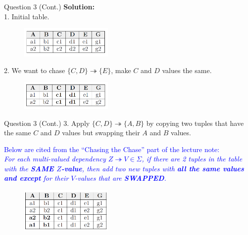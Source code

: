 \begin{frame}[fragile]{Question 3 (Cont.)}	
\textbf{Solution:}\\ \vspace{2pt}
1. Initial table.\\
\begin{figure}
	\includegraphics[width=0.4\textwidth, trim=0 0 0 0, clip]{4221-t5/images/3-1.png}
\end{figure}

2. We want to chase $\{C,D\} \twoheadrightarrow \{E\}$, make $C$ and $D$ values the same.\\
\begin{figure}
	\includegraphics[width=0.4\textwidth, trim=0 0 0 0, clip]{4221-t5/images/3-2.png}
\end{figure}

\end{frame}

\begin{frame}[fragile]{Question 3 (Cont.)}
3. Apply $\{C,D\} \twoheadrightarrow \{A,B\}$ by copying two tuples that have the same $C$ and $D$ values but swapping their $A$ and $B$ values.\\\vspace{10pt}

\textcolor{blue}{{\small Below are cited from the ``Chasing the Chase'' part of the lecture note:\\\vspace{5pt}
\textit{For each multi-valued dependency $Z\twoheadrightarrow V\in\Sigma$, if there are 2 tuples in the table with the \textbf{SAME $Z$-value}, then add two new tuples with \textbf{all the same values and except} for their $V$-values that are \textbf{SWAPPED}.}}}

\begin{figure}
	\includegraphics[width=0.4\textwidth, trim=0 0 0 0, clip]{4221-t5/images/3-3.png}
\end{figure}

\end{frame}


